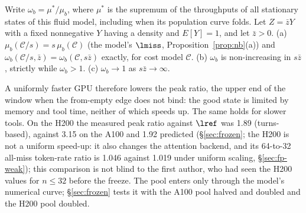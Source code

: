 \begin{proposition}\label{prop:scaling}
Write $\omega_b=\mu^*/\mu_b$, where $\mu^*$ is the supremum of the throughputs of all stationary states of this fluid model, including when its population curve folds. Let $Z=\bar zY$ with a fixed nonnegative $Y$ having a density and $E[Y]=1$, and let $\bar z>0$. (a) $\mu_b(\mathcal C/s)=s\,\mu_b(\mathcal C)$ (the model's $\lmiss$, Proposition~\ref{prop:nb}(a)) and $\omega_b(\mathcal C/s,\bar z)=\omega_b(\mathcal C,s\bar z)$ exactly, for cost model $\mathcal C$. (b) $\omega_b$ is non-increasing in $s\bar z$, strictly while $\omega_b>1$. (c) $\omega_b\to1$ as $s\bar z\to\infty$.
\end{proposition}
\noindent A uniformly faster GPU therefore lowers the peak ratio, the upper end of the window when the from-empty edge does not bind: the good state is limited by memory and tool time, neither of which speeds up. The same holds for slower tools. On the H200 the measured peak ratio against $\lref$ was 1.89 (turns-based), against 3.15 on the A100 and 1.92 predicted (\S\ref{sec:frozen}; the H200 is not a uniform speed-up: it also changes the attention backend, and its 64-to-32 all-miss token-rate ratio is 1.046 against 1.019 under uniform scaling, \S\ref{sec:fp-weak}); this comparison is not blind to the first author, who had seen the H200 values for $n\le32$ before the freeze. The pool enters only through the model's numerical curve; \S\ref{sec:frozen} tests it with the A100 pool halved and doubled and the H200 pool doubled.

